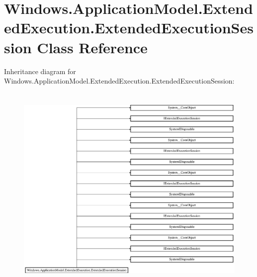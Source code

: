 \hypertarget{class_windows_1_1_application_model_1_1_extended_execution_1_1_extended_execution_session}{}\section{Windows.\+Application\+Model.\+Extended\+Execution.\+Extended\+Execution\+Session Class Reference}
\label{class_windows_1_1_application_model_1_1_extended_execution_1_1_extended_execution_session}
Inheritance diagram for Windows.\+Application\+Model.\+Extended\+Execution.\+Extended\+Execution\+Session\+:\begin{figure}[H]
\begin{center}
\leavevmode
\includegraphics[height=10.228311cm]{class_windows_1_1_application_model_1_1_extended_execution_1_1_extended_execution_session}
\end{center}
\end{figure}
